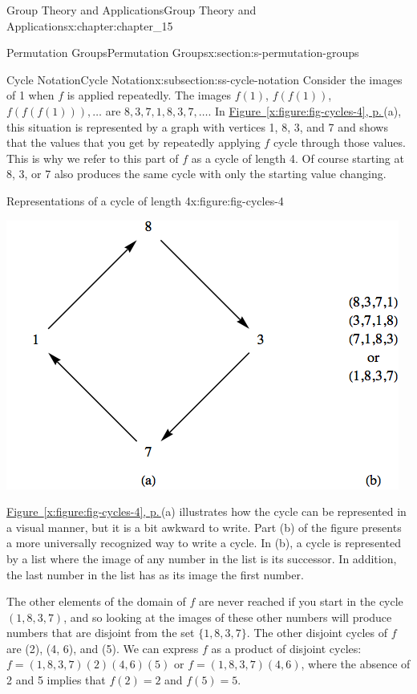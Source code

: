 \documentclass[twoside,10pt,]{book}
\newcommand{\xreffont}{\relax}
\numberwithin{equation}{section}
\begin{document}
\begin{chapterptx}{Group Theory and Applications}{}{Group Theory and Applications}{}{}{x:chapter:chapter_15}
\begin{sectionptx}{Permutation Groups}{}{Permutation Groups}{}{}{x:section:s-permutation-groups}
\begin{subsectionptx}{Cycle Notation}{}{Cycle Notation}{}{}{x:subsection:ss-cycle-notation}
Consider the images of 1 when \(f\) is applied repeatedly. The images \(f(1)\), \(f(f(1))\), \(f(f(f(1))), \ldots\) are \(8, 3, 7, 1, 8, 3, 7,\ldots\).  In \hyperref[x:figure:fig-cycles-4]{Figure~{\xreffont\ref{x:figure:fig-cycles-4}}, p.\,\pageref{x:figure:fig-cycles-4}}(a), this situation is represented by a graph with vertices 1, 8, 3, and 7 and shows that the values that you get by repeatedly applying \(f\) cycle through those values.   This is why we refer to this part of \(f\) as a cycle of length 4.  Of course starting at 8, 3, or 7 also produces the same cycle with only the starting value changing.%
\begin{figureptx}{Representations of a cycle of length 4}{x:figure:fig-cycles-4}{}%
\begin{image}{0.15}{0.7}{0.15}%
\includegraphics[width=\linewidth]{images/fig-cycles-4.png}
\end{image}%
\tcblower
\end{figureptx}%
\hyperref[x:figure:fig-cycles-4]{Figure~{\xreffont\ref{x:figure:fig-cycles-4}}, p.\,\pageref{x:figure:fig-cycles-4}}(a) illustrates how the cycle can be represented in a visual manner, but it is a bit awkward to write. Part (b) of the figure presents a more universally recognized way to write a cycle.  In (b), a cycle is represented by a list where the image of any number in the list is its successor.  In addition, the last number in the list has as its image the first number.%
\par
The other elements of the domain of \(f\) are never reached if you start in the cycle \((1,8,3,7)\), and so looking at the images of these other numbers will produce numbers that are disjoint from the set \(\{1,8,3,7\}\).   The other disjoint cycles of \(f\)  are  (2), (4, 6), and (5).  We can express \(f\) as a product of disjoint cycles: \(f= (1, 8, 3, 7)(2)(4, 6)(5)\) or \(f= (1,8,3,7)(4,6)\), where the absence of 2 and 5 implies that \(f(2) = 2\) and \(f(5) = 5\).%

\end{subsectionptx}
\end{sectionptx}
\end{chapterptx}
\end{document}
